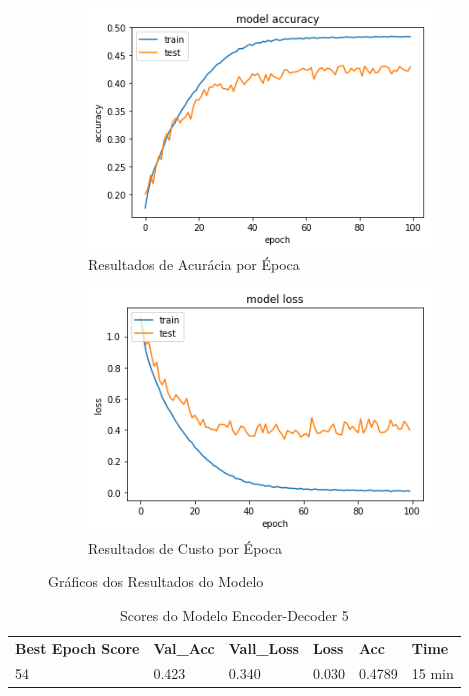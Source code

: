 \begin{figure}[H]
  \centering
  \begin{subfigure}[b]{0.45\linewidth}
    \includegraphics[width=\linewidth]{img/enc-dec-5.png}
    \caption{Resultados de Acurácia por Época}
  \end{subfigure}
  \begin{subfigure}[b]{0.45\linewidth}
    \includegraphics[width=\linewidth]{img/enc-dec-5-loss.png}
    \caption{Resultados de Custo por Época}
  \end{subfigure}
  \caption{Gráficos dos Resultados do Modelo}
  \label{fig:plots5}
\end{figure}

\begin{table}[H]
\centering
\begin{tabular}{llllll}
\textbf{Best Epoch Score} & \textbf{Val\_Acc} & \textbf{Vall\_Loss} & \textbf{Loss} & \textbf{Acc} & \textbf{Time} \\
54 & 0.423 & 0.340 & 0.030 & 0.4789 & 15 min
\end{tabular}
\caption{Scores do Modelo Encoder-Decoder 5}
\label{tab:res-enc-dec-5}
\end{table}

